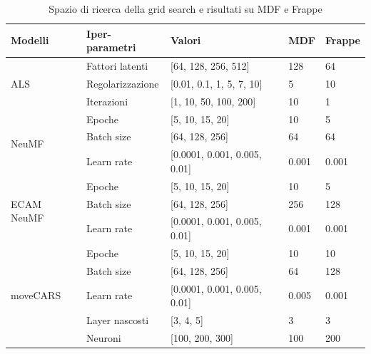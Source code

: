 \documentclass[12pt,italian]{report}
\begin{document}
\begin{table}[]
\centering
\caption{\label{tab:grid-search}Spazio di ricerca della grid search e risultati su MDF e Frappe}
\bigskip
\begin{tabular}{@{}lllll@{}}
\toprule
\textbf{Modelli}                     & \textbf{Iper-parametri}  & \textbf{Valori}       & \textbf{MDF} & \textbf{Frappe}                    \\ \midrule 
\multirow{3}{*}[-11pt]{ALS}        & Fattori latenti       & {[}64, 128, 256, 512{]} & 128 & 64          \\ \addlinespace[1em]
                            & Regolarizzazione & {[}0.01, 0.1, 1, 5, 7, 10{]}  & 5 & 10  \\  \addlinespace[1em]
                            & Iterazioni      & {[}1, 10, 50, 100, 200{]}   & 10  & 1   \\  \midrule 
                            
\multirow{3}{*}[-12pt]{NeuMF}      & Epoche         & {[}5, 10, 15, 20{]}  & 10 & 5           \\ \addlinespace[1em]
                            & Batch size     & {[}64, 128, 256{]}          & 64  & 64    \\ \addlinespace[1em]
                            & Learn rate     & {[}0.0001, 0.001, 0.005, 0.01{]} & 0.001 & 0.001 \\  \midrule 
                            
\multirow{3}{*}[-12pt]{ECAM NeuMF} & Epoche         & {[}5, 10, 15, 20{]}    & 10  & 5        \\ \addlinespace[1em]
                            & Batch size     & {[}64, 128, 256{]} & 256    & 128           \\ \addlinespace[1em]
                            & Learn rate     & {[}0.0001, 0.001, 0.005, 0.01{]} & 0.001 & 0.001\\   \midrule 
                            
\multirow{5}{*}[-24pt]{moveCARS}   & Epoche         & {[}5, 10, 15, 20{]} & 10  & 10             \\ \addlinespace[1em]
                            & Batch size     & {[}64, 128, 256{]} & 64 & 128        \\  \addlinespace[1em]
                            & Learn rate     & {[}0.0001, 0.001, 0.005, 0.01{]} & 0.005 & 0.001 \\    \addlinespace[1em]
                            & Layer nascosti        & {[}3, 4, 5{]} & 3 & 3                    \\ \addlinespace[1em]
                            & Neuroni        & {[}100, 200, 300{]} & 100 & 200\\           \bottomrule
\end{tabular}
\end{table}
\end{document}
